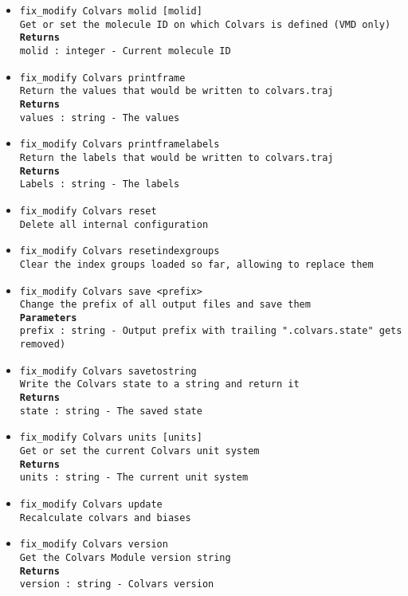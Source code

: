 \begin{itemize}
\item \texttt{fix\_modify Colvars molid [molid]}
\\
\texttt{Get or set the molecule ID on which Colvars is defined (VMD only)}
\\
\texttt{\textbf{Returns}}
\\
\texttt{molid : integer - Current molecule ID}
\item \texttt{fix\_modify Colvars printframe}
\\
\texttt{Return the values that would be written to colvars.traj}
\\
\texttt{\textbf{Returns}}
\\
\texttt{values : string - The values}
\item \texttt{fix\_modify Colvars printframelabels}
\\
\texttt{Return the labels that would be written to colvars.traj}
\\
\texttt{\textbf{Returns}}
\\
\texttt{Labels : string - The labels}
\item \texttt{fix\_modify Colvars reset}
\\
\texttt{Delete all internal configuration}
\item \texttt{fix\_modify Colvars resetindexgroups}
\\
\texttt{Clear the index groups loaded so far, allowing to replace them}
\item \texttt{fix\_modify Colvars save <prefix>}
\\
\texttt{Change the prefix of all output files and save them}
\\
\texttt{\textbf{Parameters}}
\\
\texttt{prefix : string - Output prefix with trailing ".colvars.state" gets removed)}
\item \texttt{fix\_modify Colvars savetostring}
\\
\texttt{Write the Colvars state to a string and return it}
\\
\texttt{\textbf{Returns}}
\\
\texttt{state : string - The saved state}
\item \texttt{fix\_modify Colvars units [units]}
\\
\texttt{Get or set the current Colvars unit system}
\\
\texttt{\textbf{Returns}}
\\
\texttt{units : string - The current unit system}
\item \texttt{fix\_modify Colvars update}
\\
\texttt{Recalculate colvars and biases}
\item \texttt{fix\_modify Colvars version}
\\
\texttt{Get the Colvars Module version string}
\\
\texttt{\textbf{Returns}}
\\
\texttt{version : string - Colvars version}
\end{itemize}
